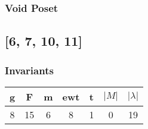 \documentclass[a4paper]{article}
\begin{document}
\hfill\begin{minipage}{0.48\textwidth}
\subsubsection*{Void Poset}
\centering
{}
\end{minipage}
\newpage\subsection{[6, 7, 10, 11]}
\noindent\begin{minipage}{0.6\textwidth}
\subsubsection*{Invariants}
\centering
\begin{tabular}{|c|c|c|c|c|c|c|}
\toprule
g & F & m & ewt & t & \(|M|\) & \(|\lambda|\) \\
\midrule
8 & 15 & 6 & 8 & 1 & 0 & 19 \\
\bottomrule
\end{tabular}
\end{minipage}%
\end{document}
